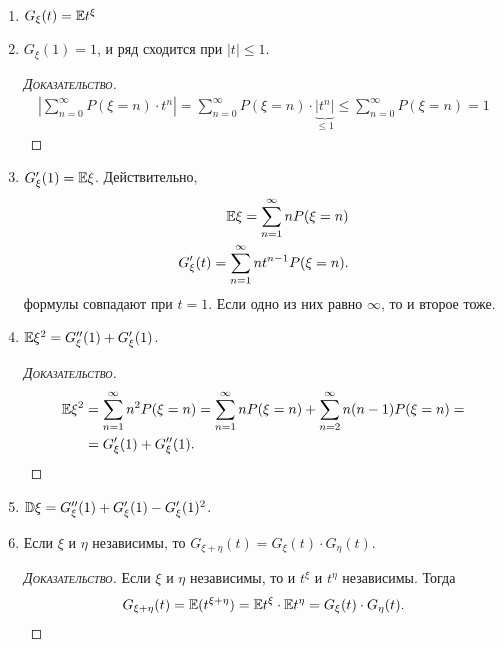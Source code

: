 \documentclass[../main.tex]{subfiles}
\begin{document}
\begin{prop}\
 \begin{enumerate}
  \item $G_\xi(t) = \mathbb E t^{\xi}$
  \item $ G_\xi(1) = 1 $, и ряд сходится при $ \left| t \right| \leqslant 1 $.
	  \begin{proof}[\normalfont\textsc{Доказательство}]
	  	\begin{align*}
			\left| \sum_{n = 0}^\infty P(\xi = n) \cdot t^{n} \right| = \sum_{n = 0}^\infty P(\xi = n) \cdot \underbrace{|t^{n}|}_{\leq 1} \leqslant \sum_{n = 0}^\infty P(\xi = n) = 1
	  	\end{align*}
	  \end{proof}
  \item $ G'_\xi(1) = \mathbb E \xi $. Действительно,
   \begin{align*}
    \mathbb E \xi = \sum_{n=1}^{\infty} n P(\xi = n) \\
    G'_\xi(t) = \sum_{n=1}^{\infty} nt^{n-1} P(\xi = n).
   \end{align*} формулы совпадают при $ t = 1 $. Если одно из них равно $ \infty $, то и второе тоже.
  \item $ \mathbb E\xi^{2} = G''_\xi(1) + G'_\xi(1) $.
   \begin{proof}[\normalfont\textsc{Доказательство}]
    \begin{align*}
     \mathbb E\xi^{2} &= \sum_{n=1}^{\infty} n^{2}P(\xi = n) = \sum_{n=1}^{\infty} nP(\xi=n) + \sum_{n=2}^{\infty} n(n-1)P(\xi = n) = \\
     &= G'_\xi(1) + G''_\xi(1).
    \end{align*}
   \end{proof}
  \item $ \mathbb D\xi = G''_\xi(1) + G'_\xi(1) - G'_\xi(1)^{2} $.
  \item Если $ \xi $ и $ \eta $ независимы, то $ G_{\xi + \eta}(t) = G_{\xi}(t) \cdot G_\eta(t) $.
   \begin{proof}[\normalfont\textsc{Доказательство}]
    Если $ \xi $ и $ \eta $ независимы, то и $ t^{\xi}  $ и $ t^{\eta} $ независимы. Тогда
    \begin{align*}
     G_{\xi+\eta}(t) = \mathbb E(t^{\xi+\eta}) = \mathbb E t^{\xi} \cdot \mathbb E t^{\eta} = G_\xi(t) \cdot G_\eta(t).
    \end{align*}
   \end{proof}
 \end{enumerate}
\end{prop}
\end{document}
